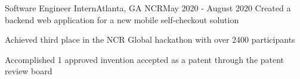 \resumeSubheading
{Software Engineer Intern}{Atlanta, GA}
{NCR}{May 2020 - August 2020}
\resumeItemListStart
\resumeItem
{
  Created a backend web application for a new mobile self-checkout solution
}

\resumeItem
{
  Achieved third place in the NCR Global hackathon with over 2400 participants
}

\resumeItem
{
  Accomplished 1 approved invention accepted as a patent through the patent review board
}

\resumeItemListEnd

